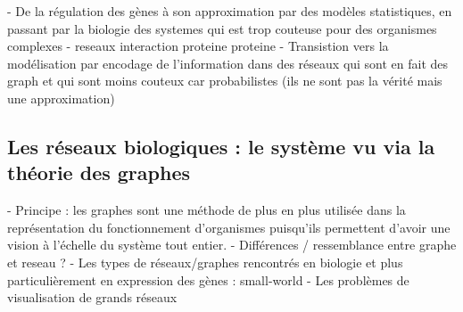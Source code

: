 
- De la régulation des gènes à son approximation par des modèles statistiques, en passant par la biologie des systemes qui est trop couteuse pour des organismes complexes %
- reseaux interaction proteine proteine
- Transistion vers la modélisation par encodage de l'information dans des réseaux qui sont en fait des graph et qui sont moins couteux car probabilistes (ils ne sont pas la vérité mais une approximation)




\subsection{Les réseaux biologiques : le système vu via la théorie des graphes}

- Principe : les graphes sont une méthode de plus en plus utilisée dans la représentation du fonctionnement d'organismes puisqu'ils permettent d'avoir une vision à l'échelle du système tout entier.
- Différences / ressemblance entre graphe et reseau ?
- Les types de réseaux/graphes rencontrés en biologie et plus particulièrement en expression des gènes : small-world
- Les problèmes de visualisation de grands réseaux %
